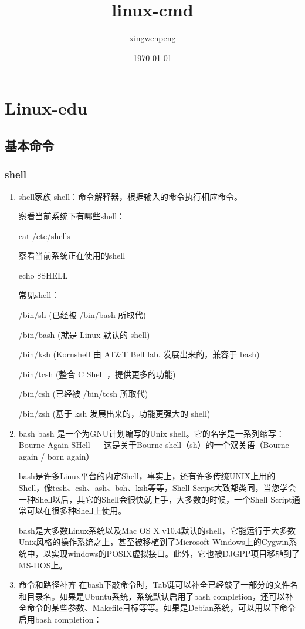 \documentclass[11pt]{article}
\author{xingwenpeng}
\date{\today}
\title{linux-cmd}
\begin{document}
\maketitle
\tableofcontents


\section{Linux-edu}
\label{sec-1}
\subsection{基本命令}
\label{sec-1-1}
\subsubsection{shell}
\label{sec-1-1-1}
\begin{enumerate}
\item shell家族
\label{sec-1-1-1-1}
shell：命令解释器，根据输入的命令执行相应命令。

察看当前系统下有哪些shell：

cat /etc/shells

察看当前系统正在使用的shell

echo \$SHELL


常见shell：

/bin/sh (已经被 /bin/bash 所取代)

/bin/bash (就是 Linux 默认的 shell)

/bin/ksh (Kornshell 由 AT\&T Bell lab. 发展出来的，兼容于 bash)

/bin/tcsh (整合 C Shell ，提供更多的功能)

/bin/csh (已经被 /bin/tcsh 所取代)

/bin/zsh (基于 ksh 发展出来的，功能更强大的 shell)

\item bash
\label{sec-1-1-1-2}
bash 是一个为GNU计划编写的Unix shell。它的名字是一系列缩写：Bourne-Again SHell — 这是关于Bourne shell（sh）的一个双关语（Bourne again / born again）

bash是许多Linux平台的内定Shell，事实上，还有许多传统UNIX上用的Shell，像tcsh、csh、ash、bsh、ksh等等，Shell Script大致都类同，当您学会一种Shell以后，其它的Shell会很快就上手，大多数的时候，一个Shell Script通常可以在很多种Shell上使用。

bash是大多数Linux系统以及Mac OS X v10.4默认的shell，它能运行于大多数Unix风格的操作系统之上，甚至被移植到了Microsoft Windows上的Cygwin系统中，以实现windows的POSIX虚拟接口。此外，它也被DJGPP项目移植到了MS-DOS上。
\item 命令和路径补齐
\label{sec-1-1-1-3}
在bash下敲命令时，Tab键可以补全已经敲了一部分的文件名和目录名。如果是Ubuntu系统，系统默认启用了bash completion，还可以补全命令的某些参数、Makefile目标等等。如果是Debian系统，可以用以下命令启用bash completion： 


\end{enumerate}
\end{document}
